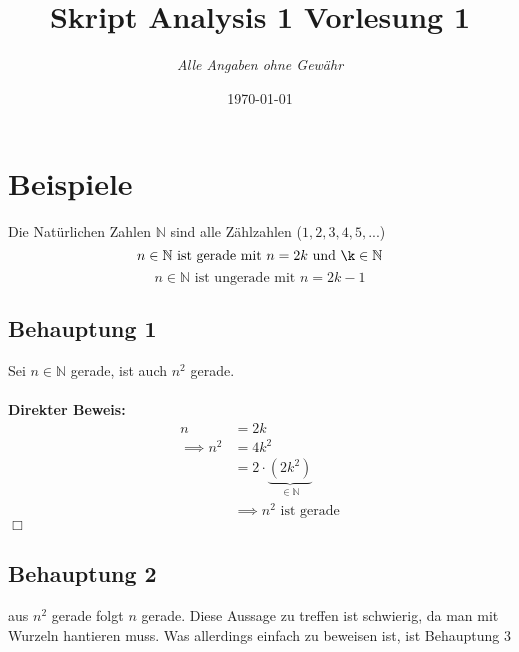 \documentclass{article}
\title{Skript Analysis 1 Vorlesung 1} %
\author{\textit{Alle Angaben ohne Gewähr}} %
\date{\today} %
\begin{document}

	\maketitle %
    \section{Beispiele}
        Die Natürlichen Zahlen $\mathbb{N}$ sind alle Zählzahlen ($1,2,3,4,5,...$) \\
         $$n\in \mathbb{N} \text{ ist gerade mit } n=2k \text{ und } \k\in \mathbb{N}\\$$
         $$n\in \mathbb{N} \text{ ist ungerade mit } n=2k-1$$
        \subsection{Behauptung 1}
            Sei $n\in \mathbb{N}$ gerade, ist auch $n^2$ gerade.\\\\
            \textbf{Direkter Beweis:}
            \begin{align*}
                n &= 2k \\
                \implies n^2 &= 4k^2 \\
                \, &= 2 \cdot \underbrace{(2k^2)}_{\in \mathbb{N}} \\
                &\implies n^2 \text{ ist gerade}
            \end{align*}
	    \hfill $\Box$
        \subsection{Behauptung 2}
            aus $n^2$ gerade folgt $n$ gerade. Diese Aussage zu treffen ist schwierig, da man mit Wurzeln hantieren muss. Was allerdings einfach zu beweisen ist, ist Behauptung 3
\end{document}
